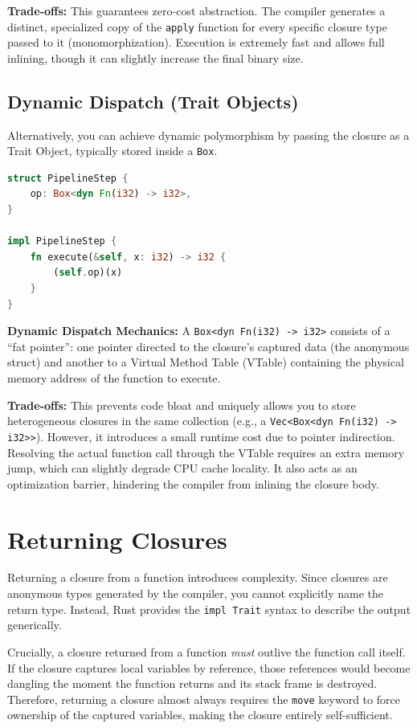 \textbf{Trade-offs:} This guarantees zero-cost abstraction. The compiler generates a distinct, specialized copy of the \texttt{apply} function for every specific closure type passed to it (monomorphization). Execution is extremely fast and allows full inlining, though it can slightly increase the final binary size.

\subsection{Dynamic Dispatch (Trait Objects)}
Alternatively, you can achieve dynamic polymorphism by passing the closure as a Trait Object, typically stored inside a \texttt{Box}.

\begin{lstlisting}[language=Rust]
struct PipelineStep {
    op: Box<dyn Fn(i32) -> i32>,
}

impl PipelineStep {
    fn execute(&self, x: i32) -> i32 {
        (self.op)(x)
    }
}
\end{lstlisting}

\begin{notebox}
\textbf{Dynamic Dispatch Mechanics:} A \texttt{Box<dyn Fn(i32) -> i32>} consists of a ``fat pointer'': one pointer directed to the closure's captured data (the anonymous struct) and another to a Virtual Method Table (VTable) containing the physical memory address of the function to execute.
\end{notebox}

\textbf{Trade-offs:} This prevents code bloat and uniquely allows you to store heterogeneous closures in the same collection (e.g., a \texttt{Vec<Box<dyn Fn(i32) -> i32>>}). However, it introduces a small runtime cost due to pointer indirection. Resolving the actual function call through the VTable requires an extra memory jump, which can slightly degrade CPU cache locality. It also acts as an optimization barrier, hindering the compiler from inlining the closure body.

\section{Returning Closures}
Returning a closure from a function introduces complexity. Since closures are anonymous types generated by the compiler, you cannot explicitly name the return type. Instead, Rust provides the \texttt{impl Trait} syntax to describe the output generically.

Crucially, a closure returned from a function \textit{must} outlive the function call itself. If the closure captures local variables by reference, those references would become dangling the moment the function returns and its stack frame is destroyed. Therefore, returning a closure almost always requires the \texttt{move} keyword to force ownership of the captured variables, making the closure entirely self-sufficient.

